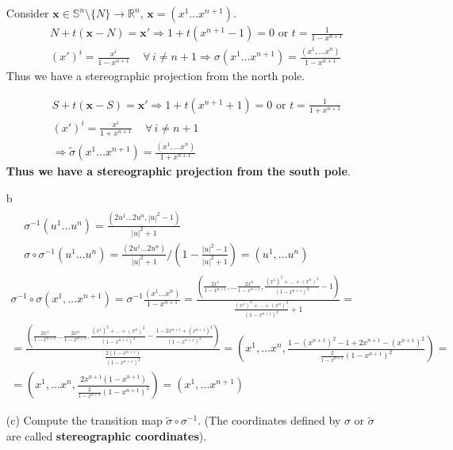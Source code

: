 \documentclass[10pt]{amsart}
\begin{document}
\begin{multicols*}{2}
\begin{enumerate}
Consider $\mathbf{x} \in \mathbb{S}^n \setminus \lbrace N \rbrace \to \mathbb{R}^n$, $\mathbf{x} = (x^1 \dots x^{n+1})$.
\[
\begin{gathered}
	N + t(\mathbf{x} - N) = \mathbf{x}' \Longrightarrow 1 + t(x^{n+1} - 1 ) = 0 \text{ or } t = \frac{1}{ 1- x^{n+1}} \\
	(x')^i = \frac{x^i}{ 1 - x^{n+1}}  \quad \, \forall \, i \neq n + 1
\Longrightarrow \sigma(x^1 \dots x^{n+1}) = \frac{ (x^1, \dots x^n) }{ 1 - x^{n+1}}
\end{gathered}
\]
Thus we have a stereographic projection from the north pole.

\[
\begin{gathered}
	S + t(\mathbf{x} - S) = \mathbf{x}' \Longrightarrow 1 + t(x^{n+1} + 1) = 0 \text{ or } t= \frac{1}{1 + x^{n+1}} \\
	(x')^i = \frac{x^i }{ 1 + x^{n+1}} \quad \, \forall \, i \neq n + 1 \\
	\Longrightarrow \widetilde{\sigma}(x^1 \dots x^{n+1}) = \frac{ (x^1, \dots x^n) }{ 1 + x^{n+1}}
\end{gathered}
\]
\textbf{Thus we have a stereographic projection from the south pole}.

\item[b]
\[
\begin{gathered}
\begin{aligned}
	& \sigma^{-1} (u^1 \dots u^n) = \frac{(2u^1 \dots 2u^n, |u|^2 - 1) }{ |u|^2 + 1 } \\
	& \sigma \circ \sigma^{-1}(u^1 \dots u^n) = \frac{ (2u^1 \dots 2u^n) }{ |u|^2 + 1 } / \left( 1 - \frac{ |u|^2 - 1 }{ |u|^2 + 1 } \right) = (u^1, \dots u^n)
\end{aligned}	\\
\sigma^{-1} \circ \sigma(x^1, \dots x^{n+1}) = \sigma^{-1} \frac{ (x^1 \dots x^n) }{ 1 - x^{n+1} } = \frac{ \left(\frac{ 2 x^1}{ 1 - x^{n+1} } , \dots \frac{2x^n}{1 - x^{n+1} } , \frac{ (x^1)^2 + \dots + (x^n)^2 }{ ( 1- x^{n+1})^2 } - 1 \right) }{ \frac{ (x^1)^2 + \dots + (x^n)^2}{ (1- x^{n+1})^2 } + 1 } = \\
= \frac{ \left( \frac{ 2 x^1}{ 1 - x^{n+1}} \dots \frac{2x^n}{1- x^{n+1}} , \frac{ (x^1)^2 + \dots + (x^n)^2 }{ (1-x^{n+1})^2} - \frac{ 1 - 2x^{n+1} + (x^{n+1})^2 }{ (1- x^{n+1})^2} \right) }{ \frac{2(1-x^{n+1})}{(1-x^{n+1})^2} } = \left( x^1, \dots x^n , \frac{ 1 - (x^{n+1})^2 - 1 + 2x^{n+1} - (x^{n+1})^2 }{ \frac{ 2 }{ 1 - x^{n+1}} (1- x^{n+1})^2 } \right) = \\
= (x^1, \dots x^n , \frac{2 x^{n+1} ( 1 -x^{n+1}) }{ \frac{ 2 }{ 1 - x^{n+1}} ( 1 - x^{n+1})^2 } ) = (x^1, \dots x^{n+1})
\end{gathered}
\]
\item[(c)] Compute the transition map $\widetilde{\sigma} \circ \sigma^{-1}$. (The coordinates defined by $\sigma$ or $\widetilde{\sigma}$ are called \textbf{stereographic coordinates}).


\end{enumerate}
\end{multicols*}
\end{document}
